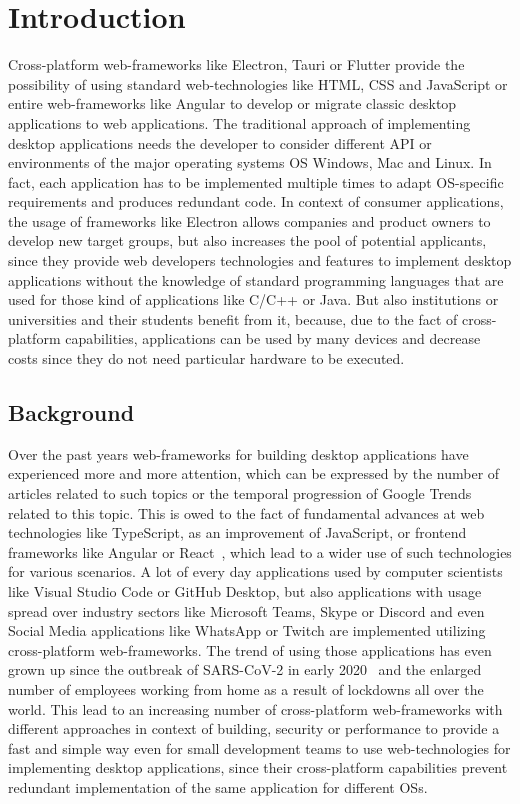 \section{Introduction}\label{sec:introduction}
Cross-platform web-frameworks like Electron, Tauri or Flutter provide the possibility of using standard web-technologies like \ac{HTML}, \ac{CSS} and JavaScript or entire web-frameworks
like Angular to develop or migrate classic desktop applications to web applications.
The traditional approach of implementing desktop applications needs the developer to consider different \ac{API} or environments of the major operating systems \ac{OS}
Windows, Mac and Linux.
In fact, each application has to be implemented multiple times to adapt \ac{OS}-specific requirements and produces redundant code.
In context of consumer applications, the usage of frameworks like Electron allows companies and product owners to develop new target groups, but also increases the pool of potential applicants,
since they provide web developers technologies and features to implement desktop applications without the knowledge of standard programming languages that are used for those kind of applications
like C/C++ or Java.
But also institutions or universities and their students benefit from it, because, due to the fact of cross-platform capabilities, applications can be used by many devices and decrease costs
since they do not need particular hardware to be executed.

\subsection{Background}\label{subsec:background}
Over the past years web-frameworks for building desktop applications have experienced more and more attention, which can be expressed by the number of articles related to such topics or the temporal progression of Google Trends related to this topic.
This is owed to the fact of fundamental advances at web technologies like TypeScript, as an improvement of JavaScript, or frontend frameworks like Angular or React~\cite{pernice:icalepcs2019-wempr006},
which lead to a wider use of such technologies for various scenarios.
A lot of every day applications used by computer scientists like Visual Studio Code or GitHub Desktop, but also applications with usage spread over industry sectors
like Microsoft Teams, Skype or Discord and even Social Media applications like WhatsApp or Twitch are implemented utilizing cross-platform web-frameworks.
The trend of using those applications has even grown up since the outbreak of SARS-CoV-2 in early 2020~\cite{Gorbalenya2020} and the enlarged number of employees working from home
as a result of lockdowns all over the world.
This lead to an increasing number of cross-platform web-frameworks with different approaches in context of building, security or performance to provide a fast and simple way even for small development teams
to use web-technologies for implementing desktop applications, since their cross-platform capabilities prevent redundant implementation of the same application for different \ac{OS}s.

